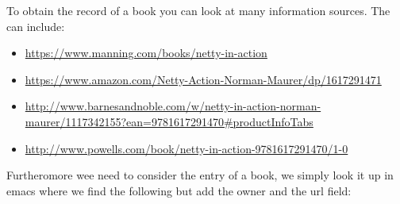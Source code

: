 \begin{sphinxVerbatim}[commandchars=\\\{\}]
        
          
       
      
\end{sphinxVerbatim}

To obtain the record of a book you can look at many information
sources. The can include:
\begin{itemize}
\item {} 
\url{https://www.manning.com/books/netty-in-action}

\item {} 
\url{https://www.amazon.com/Netty-Action-Norman-Maurer/dp/1617291471}

\item {} 
\url{http://www.barnesandnoble.com/w/netty-in-action-norman-maurer/1117342155?ean=9781617291470\#productInfoTabs}

\item {} 
\url{http://www.powells.com/book/netty-in-action-9781617291470/1-0}

\end{itemize}

Furtheromore wee need to consider the entry of a book, we simply look
it up in emacs where we find the following but add the owner and the
url field:

